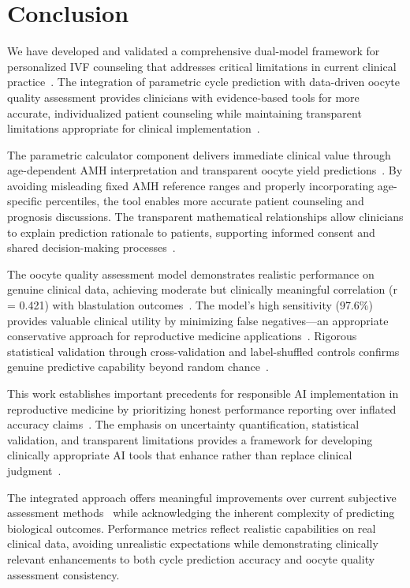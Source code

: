 \section{Conclusion}\label{sec:conclusion}

We have developed and validated a comprehensive dual-model framework for personalized IVF counseling that addresses critical limitations in current clinical practice~\cite{gameiro2023understanding,asrm2017embryo}. The integration of parametric cycle prediction with data-driven oocyte quality assessment provides clinicians with evidence-based tools for more accurate, individualized patient counseling while maintaining transparent limitations appropriate for clinical implementation~\cite{fda2022clinical}.

The parametric calculator component delivers immediate clinical value through age-dependent AMH interpretation and transparent oocyte yield predictions~\cite{lee2017amh,song2021amh}. By avoiding misleading fixed AMH reference ranges and properly incorporating age-specific percentiles, the tool enables more accurate patient counseling and prognosis discussions. The transparent mathematical relationships allow clinicians to explain prediction rationale to patients, supporting informed consent and shared decision-making processes~\cite{beauchamp2019principles,asrm2021counselors}.

The oocyte quality assessment model demonstrates realistic performance on genuine clinical data, achieving moderate but clinically meaningful correlation (r = 0.421) with blastulation outcomes~\cite{varoquaux2022machine}. The model's high sensitivity (97.6\%) provides valuable clinical utility by minimizing false negatives—an appropriate conservative approach for reproductive medicine applications~\cite{cutting2008elective}. Rigorous statistical validation through cross-validation and label-shuffled controls confirms genuine predictive capability beyond random chance~\cite{cohen1988statistical,mann1947test}.

This work establishes important precedents for responsible AI implementation in reproductive medicine by prioritizing honest performance reporting over inflated accuracy claims~\cite{rudin2019stop,topol2019high}. The emphasis on uncertainty quantification, statistical validation, and transparent limitations provides a framework for developing clinically appropriate AI tools that enhance rather than replace clinical judgment~\cite{rajkomar2019machine}.

The integrated approach offers meaningful improvements over current subjective assessment methods~\cite{paternot2009observer,paternot2011multicentre} while acknowledging the inherent complexity of predicting biological outcomes. Performance metrics reflect realistic capabilities on real clinical data, avoiding unrealistic expectations while demonstrating clinically relevant enhancements to both cycle prediction accuracy and oocyte quality assessment consistency.


